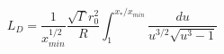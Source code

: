 \begin{equation}
L_D=\frac{1}{x_{min}^{1/2}}\frac{\sqrt \Gamma 
r_0^2}{R}\int_1^{x_{*}/x_{min}}\frac{du}{u^{3/2}\sqrt{u^3-1}}
\end{equation}

